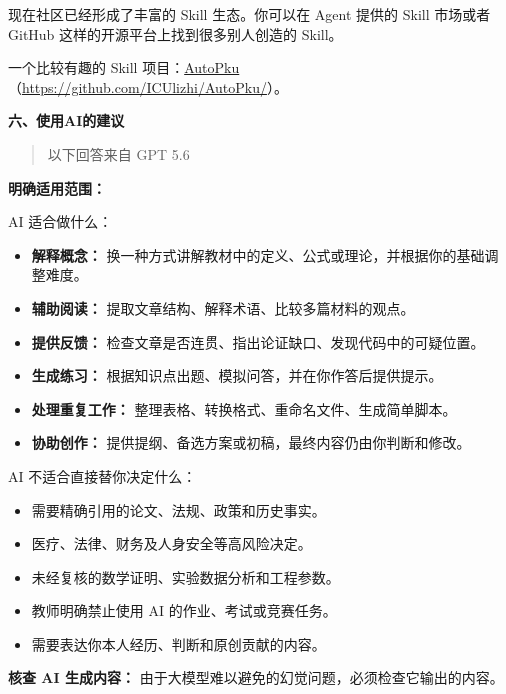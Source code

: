 \documentclass[11pt,oneside]{book}
\begin{document}
现在社区已经形成了丰富的 Skill 生态。你可以在 Agent 提供的 Skill 市场或者 GitHub 这样的开源平台上找到很多别人创造的 Skill。

一个比较有趣的 Skill 项目：\href{https://github.com/ICUlizhi/AutoPku/}{AutoPku}（\url{https://github.com/ICUlizhi/AutoPku/}）。

\vspace{10pt}

\textbf{六、使用AI的建议}

\begin{quote}
以下回答来自 GPT 5.6
\end{quote}

\textbf{明确适用范围：}

AI 适合做什么：

\begin{itemize}
    \item \textbf{解释概念：} 换一种方式讲解教材中的定义、公式或理论，并根据你的基础调整难度。
    \item \textbf{辅助阅读：} 提取文章结构、解释术语、比较多篇材料的观点。
    \item \textbf{提供反馈：} 检查文章是否连贯、指出论证缺口、发现代码中的可疑位置。
    \item \textbf{生成练习：} 根据知识点出题、模拟问答，并在你作答后提供提示。
    \item \textbf{处理重复工作：} 整理表格、转换格式、重命名文件、生成简单脚本。
    \item \textbf{协助创作：} 提供提纲、备选方案或初稿，最终内容仍由你判断和修改。
\end{itemize}

AI 不适合直接替你决定什么：

\begin{itemize}
    \item 需要精确引用的论文、法规、政策和历史事实。
    \item 医疗、法律、财务及人身安全等高风险决定。
    \item 未经复核的数学证明、实验数据分析和工程参数。
    \item 教师明确禁止使用 AI 的作业、考试或竞赛任务。
    \item 需要表达你本人经历、判断和原创贡献的内容。
\end{itemize}

\textbf{核查 AI 生成内容：} 由于大模型难以避免的幻觉问题，必须检查它输出的内容。
\end{document}
